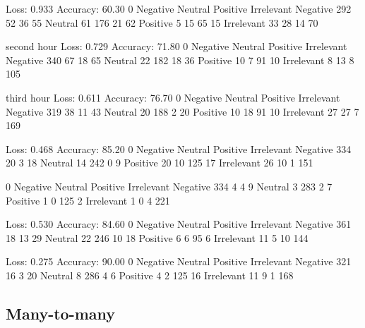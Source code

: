 \documentclass[10pt]{amsart}
\theoremstyle{definition}
\begin{document}
Loss: 0.933 Accuracy: 60.30%
0	Negative	Neutral	Positive	Irrelevant
Negative	292	52	36	55
Neutral	61	176	21	62
Positive	5	15	65	15
Irrelevant	33	28	14	70


second hour
Loss: 0.729 Accuracy: 71.80%
0	Negative	Neutral	Positive	Irrelevant
Negative	340	67	18	65
Neutral	22	182	18	36
Positive	10	7	91	10
Irrelevant	8	13	8	105

third hour
Loss: 0.611 Accuracy: 76.70%
0	Negative	Neutral	Positive	Irrelevant
Negative	319	38	11	43
Neutral	20	188	2	20
Positive	10	18	91	10
Irrelevant	27	27	7	169

Loss: 0.468 Accuracy: 85.20%
0	Negative	Neutral	Positive	Irrelevant
Negative	334	20	3	18
Neutral	14	242	0	9
Positive	20	10	125	17
Irrelevant	26	10	1	151

0	Negative	Neutral	Positive	Irrelevant
Negative	334	4	4	9
Neutral	3	283	2	7
Positive	1	0	125	2
Irrelevant	1	0	4	221

Loss: 0.530 Accuracy: 84.60%
0	Negative	Neutral	Positive	Irrelevant
Negative	361	18	13	29
Neutral	22	246	10	18
Positive	6	6	95	6
Irrelevant	11	5	10	144


Loss: 0.275 Accuracy: 90.00%
0	Negative	Neutral	Positive	Irrelevant
Negative	321	16	3	20
Neutral	8	286	4	6
Positive	4	2	125	16
Irrelevant	11	9	1	168

\subsection{Many-to-many}
\end{document}
